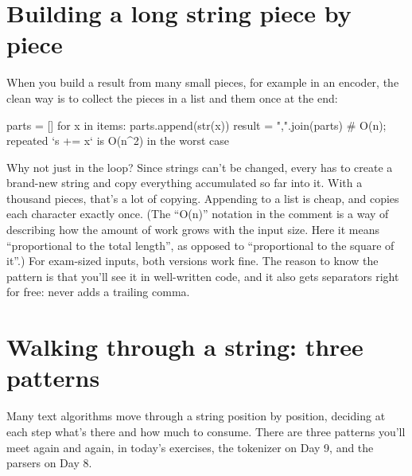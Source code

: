 \documentclass[10pt,a4paper]{article}
\begin{document}
\section{Building a long string piece by piece}
When you build a result from many small pieces, for example in an encoder, the clean way is to collect the pieces in a list and  them once at the end:
\begin{pycode}
parts = []
for x in items:
    parts.append(str(x))
result = ",".join(parts)        # O(n); repeated `s += x` is O(n^2) in the worst case
\end{pycode}
Why not just  in the loop? Since strings can’t be changed, every \code{+=\allowbreak{}} has to create a brand-new string and copy everything accumulated so far into it. With a thousand pieces, that’s a lot of copying. Appending to a list is cheap, and  copies each character exactly once. (The “O(n)” notation in the comment is a way of describing how the amount of work grows with the input size. Here it means “proportional to the total length”, as opposed to “proportional to the square of it”.)
For exam-sized inputs, both versions work fine. The reason to know the pattern is that you’ll see it in well-written code, and it also gets separators right for free:  never adds a trailing comma.
\setcounter{section}{5}
\section{Walking through a string: three patterns}
Many text algorithms move through a string position by position, deciding at each step what’s there and how much to consume. There are three patterns you’ll meet again and again, in today’s exercises, the tokenizer on Day 9, and the parsers on Day 8.
\end{document}
